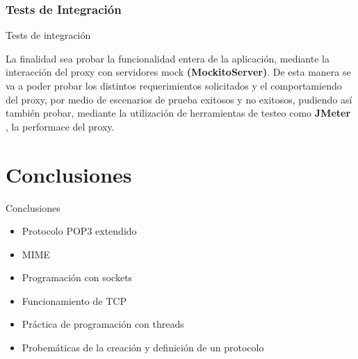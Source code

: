 \documentclass{beamer}
\begin{document}
\subsubsection{Tests de Integración}
\begin{frame}{Tests de integración}
\par	La finalidad sea probar la funcionalidad entera de la aplicación, mediante la interacción del proxy con servidores mock \textbf{(MockitoServer)}. De esta manera se va a poder probar los distintos requerimientos solicitados y el comportamiendo del proxy, por medio de escenarios de prueba exitosos y no exitosos, pudiendo así también probar, mediante la utilización de herramientas de testeo como \textbf{JMeter} , la performace del proxy.
\end{frame}


\section{Conclusiones}
\begin{frame}{Conclusiones}


\begin{itemize}
\item Protocolo POP3 extendido
\item MIME
\item Programación con sockets
\item Funcionamiento de TCP
\item Práctica de programación con threads
\item Probemáticas de la creación y definición de un protocolo

\end{itemize}
\end{frame}
\end{document}
